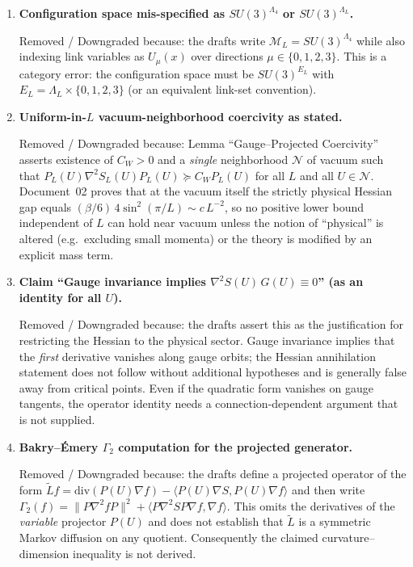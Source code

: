 \documentclass[11pt]{article}
\begin{document}
\begin{enumerate}[leftmargin=*]

\item \textbf{Configuration space mis-specified as $SU(3)^{\Lambda_4}$ or $SU(3)^{\Lambda_L}$.}

Removed / Downgraded because:
the drafts write $\mathcal M_L = SU(3)^{\Lambda_4}$ while also indexing link variables as $U_\mu(x)$ over directions $\mu\in\{0,1,2,3\}$.
This is a category error: the configuration space must be $SU(3)^{E_L}$ with $E_L=\Lambda_L\times\{0,1,2,3\}$ (or an equivalent link-set convention).

\item \textbf{Uniform-in-$L$ vacuum-neighborhood coercivity as stated.}

Removed / Downgraded because:
Lemma ``Gauge--Projected Coercivity'' asserts existence of $C_W>0$ and a \emph{single} neighborhood $\mathcal N$ of vacuum such that
$P_L(U)\nabla^2 S_L(U)P_L(U)\succeq C_W P_L(U)$ for all $L$ and all $U\in\mathcal N$.
Document~02 proves that at the vacuum itself the strictly physical Hessian gap equals $(\beta/6)\,4\sin^2(\pi/L)\sim c\,L^{-2}$,
so no positive lower bound independent of $L$ can hold near vacuum unless the notion of ``physical'' is altered (e.g.\ excluding small momenta) or the theory is modified by an explicit mass term.

\item \textbf{Claim ``Gauge invariance implies $\nabla^2 S(U)\,G(U)\equiv 0$'' (as an identity for all $U$).}

Removed / Downgraded because:
the drafts assert this as the justification for restricting the Hessian to the physical sector.
Gauge invariance implies that the \emph{first} derivative vanishes along gauge orbits; the Hessian annihilation statement does not follow without additional hypotheses and is generally false away from critical points.
Even if the quadratic form vanishes on gauge tangents, the operator identity needs a connection-dependent argument that is not supplied.

\item \textbf{Bakry--\'Emery $\Gamma_2$ computation for the projected generator.}

Removed / Downgraded because:
the drafts define a projected operator of the form $\tilde Lf=\mathrm{div}(P(U)\nabla f)-\langle P(U)\nabla S,P(U)\nabla f\rangle$
and then write $\Gamma_2(f)=\|P\nabla^2 fP\|^2+\langle P\nabla^2 S P\nabla f,\nabla f\rangle$.
This omits the derivatives of the \emph{variable} projector $P(U)$ and does not establish that $\tilde L$ is a symmetric Markov diffusion on any quotient.
Consequently the claimed curvature--dimension inequality is not derived.


\end{enumerate}
\end{document}
